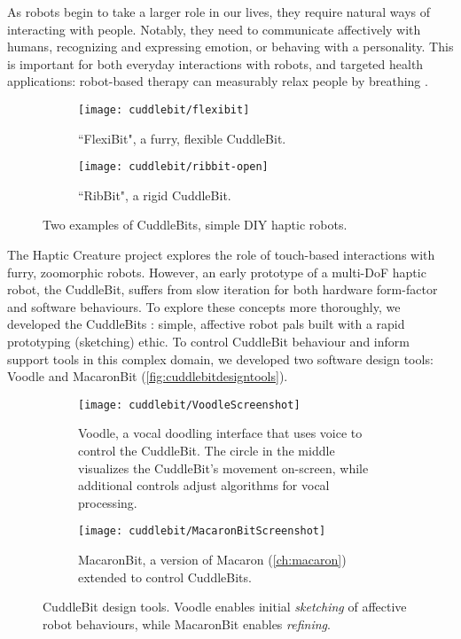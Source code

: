 As robots begin to take a larger role in our lives, they require natural ways of interacting with people.
Notably, they need to communicate affectively with humans, recognizing and expressing emotion, or behaving with a  personality.
This is important for both everyday interactions with robots, and targeted health applications: robot-based therapy can measurably relax people by breathing \cite{Sefidgar2016}.



\begin{figure}[htbp] %
   \centering
      \begin{subfigure}{0.5\textwidth}
   	   \texttt{[image: cuddlebit/flexibit]} 
	      \caption{``FlexiBit", a furry, flexible CuddleBit.}
	      \label{fig:flexibit}
   \end{subfigure}
   \qquad
   \begin{subfigure}{0.4\textwidth}
   	   \texttt{[image: cuddlebit/ribbit-open]} 
	      \caption{``RibBit", a rigid CuddleBit.}
	      \label{fig:ribbit}
   \end{subfigure}
   \caption{Two examples of CuddleBits, simple DIY haptic robots.}
   \label{fig:cuddlebits}
\end{figure}



The Haptic Creature project \cite{Yohanan2011affectdisplay,Yohanan2011affectivetouch} explores the role of touch-based interactions with furry, zoomorphic robots.
However, an early prototype of a multi-DoF haptic robot, the CuddleBit, suffers from slow iteration for both hardware form-factor and software behaviours.
To explore these concepts more thoroughly, we developed the CuddleBits \cite{cang2015cuddlebits}: simple, affective robot pals built with a rapid prototyping (sketching) ethic.
To control CuddleBit behaviour and inform \haxd support tools in this complex domain, we developed two software design tools: Voodle and MacaronBit (\autoref{fig:cuddlebitdesigntools}).

\begin{figure}[htbp] %
   \centering
      \begin{subfigure}{\textwidth}
   	   \texttt{[image: cuddlebit/VoodleScreenshot]} 
	      \caption{Voodle, a vocal doodling interface that uses voice to control the CuddleBit. The circle in the middle visualizes the CuddleBit's movement on-screen, while  additional controls adjust algorithms for vocal processing.}
	      \label{fig:voodle}
   \end{subfigure}
   \qquad
   \begin{subfigure}{\textwidth}
   	   \texttt{[image: cuddlebit/MacaronBitScreenshot]} 
	      \caption{MacaronBit, a version of Macaron (\autoref{ch:macaron}) extended to control CuddleBits.}
	      \label{fig:macaronbit}
   \end{subfigure}
   \caption{CuddleBit design tools. Voodle enables initial \emph{sketching} of affective robot behaviours, while MacaronBit enables \emph{refining}.}
   \label{fig:cuddlebitdesigntools}
\end{figure}

